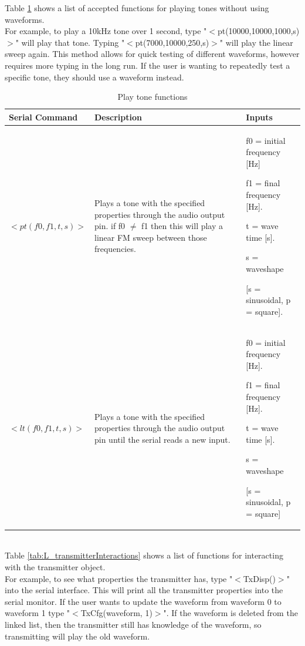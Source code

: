 \documentclass[12pt, a4paper]{article}
\begin{document}
\pagebreak

Table \ref{tab:L_toneInteractions} shows a list of accepted functions for playing tones without using waveforms. \\

For example, to play a 10kHz tone over 1 second, type "$<$pt(10000,10000,1000,s)$>$" will play that tone. Typing "$<$pt(7000,10000,250,s)$>$" will play the linear sweep again. This method allows for quick testing of different waveforms, however requires more typing in the long run. If the user is wanting to repeatedly test a specific tone, they should use a waveform instead. \\
\begin{table} [!htb]
	\caption{Play tone functions}
	\label{tab:L_toneInteractions}
	\centering
	\begin{tabular}{ |m{}|m{}|m{}| } 
		\hline
		Serial Command & Description & Inputs \\ 
		\hline
		\hline
		\centering $<pt(f0,f1,t,s)>$ & Plays a tone with the specified properties through the audio output pin. if f0 $\neq$ f1 then this will play a linear FM sweep between those frequencies. & f0 = initial frequency [Hz]
		
		f1 = final frequency [Hz].
		
		t = wave time [s].
		
		s = waveshape 
		
		[s = sinusoidal, p = square]. \\
		
		\hline
		\centering $<lt(f0,f1,t,s)>$ & Plays a tone with the specified properties through the audio output pin until the serial reads a new input. & f0 = initial frequency [Hz].
		
		f1 = final frequency [Hz].
		
		t = wave time [s].
		
		s = waveshape 
		
		[s = sinusoidal, p = square] \\
		
		\hline
		
	\end{tabular}
\end{table} \\
\pagebreak
Table \ref{tab:L_transmitterInteractions} shows a list of functions for interacting with the transmitter object. \\

For example, to see what properties the transmitter has, type "$<$TxDisp()$>$" into the serial interface. This will print all the transmitter properties into the serial monitor. If the user wants to update the waveform from waveform 0 to waveform 1 type "$<$TxCfg(waveform, 1)$>$". If the waveform is deleted from the linked list, then the transmitter still has knowledge of the waveform, so transmitting will play the old waveform. \\
\end{document}

